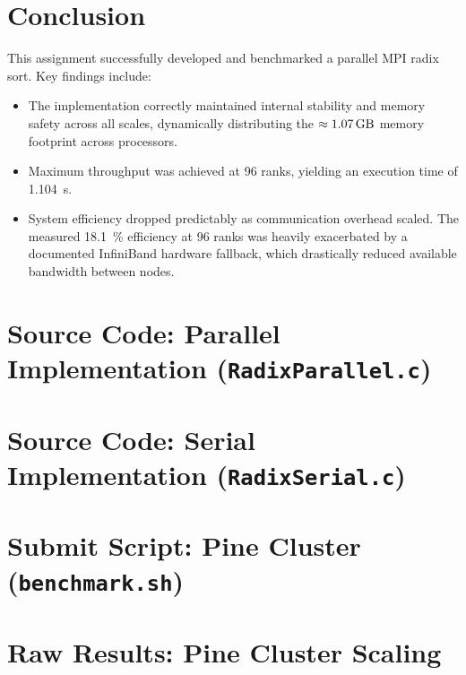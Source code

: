 \documentclass[11pt]{article}
\begin{document}
\section{Conclusion}
This assignment successfully developed and benchmarked a parallel MPI radix sort. Key findings include:
\begin{itemize}
  \item The implementation correctly maintained internal stability and memory safety across all scales, dynamically distributing the $\approx \SI{1.07}{\giga\byte}$ memory footprint across processors.
  \item Maximum throughput was achieved at 96 ranks, yielding an execution time of \SI{1.104}{\second}.
  \item System efficiency dropped predictably as communication overhead scaled. The measured \SI{18.1}{\percent} efficiency at 96 ranks was heavily exacerbated by a documented InfiniBand hardware fallback, which drastically reduced available bandwidth between nodes.
\end{itemize}

\newpage
\appendix
\section{Source Code: Parallel Implementation (\texttt{RadixParallel.c})}


\newpage
\section{Source Code: Serial Implementation (\texttt{RadixSerial.c})}


\newpage
\section{Submit Script: Pine Cluster (\texttt{benchmark.sh})}


\newpage
\section{Raw Results: Pine Cluster Scaling}

\end{document}
